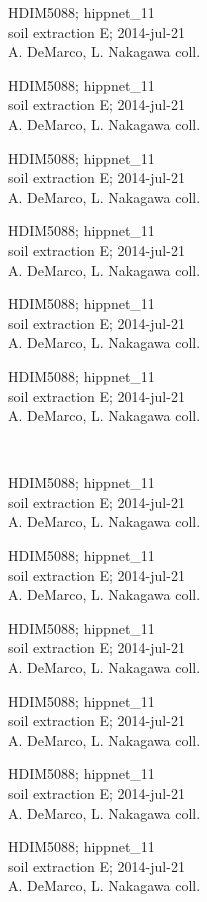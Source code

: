 \documentclass[2pt]{extarticle}
\begin{document}
\noindent
\parbox{0.16\textwidth}{\tiny \raggedright \rule[-0.3\baselineskip]{0pt}{10pt}HDIM5088; hippnet\_11\\ soil extraction E; 2014-jul-21\\ A. DeMarco, L. Nakagawa coll.}
\parbox{0.16\textwidth}{\tiny \raggedright \rule[-0.3\baselineskip]{0pt}{10pt}HDIM5088; hippnet\_11\\ soil extraction E; 2014-jul-21\\ A. DeMarco, L. Nakagawa coll.}
\parbox{0.16\textwidth}{\tiny \raggedright \rule[-0.3\baselineskip]{0pt}{10pt}HDIM5088; hippnet\_11\\ soil extraction E; 2014-jul-21\\ A. DeMarco, L. Nakagawa coll.}
\parbox{0.16\textwidth}{\tiny \raggedright \rule[-0.3\baselineskip]{0pt}{10pt}HDIM5088; hippnet\_11\\ soil extraction E; 2014-jul-21\\ A. DeMarco, L. Nakagawa coll.}
\parbox{0.16\textwidth}{\tiny \raggedright \rule[-0.3\baselineskip]{0pt}{10pt}HDIM5088; hippnet\_11\\ soil extraction E; 2014-jul-21\\ A. DeMarco, L. Nakagawa coll.}
\parbox{0.16\textwidth}{\tiny \raggedright \rule[-0.3\baselineskip]{0pt}{10pt}HDIM5088; hippnet\_11\\ soil extraction E; 2014-jul-21\\ A. DeMarco, L. Nakagawa coll.} \\ 
\vspace{0.001in} 

\noindent
\parbox{0.16\textwidth}{\tiny \raggedright \rule[-0.3\baselineskip]{0pt}{10pt}HDIM5088; hippnet\_11\\ soil extraction E; 2014-jul-21\\ A. DeMarco, L. Nakagawa coll.}
\parbox{0.16\textwidth}{\tiny \raggedright \rule[-0.3\baselineskip]{0pt}{10pt}HDIM5088; hippnet\_11\\ soil extraction E; 2014-jul-21\\ A. DeMarco, L. Nakagawa coll.}
\parbox{0.16\textwidth}{\tiny \raggedright \rule[-0.3\baselineskip]{0pt}{10pt}HDIM5088; hippnet\_11\\ soil extraction E; 2014-jul-21\\ A. DeMarco, L. Nakagawa coll.}
\parbox{0.16\textwidth}{\tiny \raggedright \rule[-0.3\baselineskip]{0pt}{10pt}HDIM5088; hippnet\_11\\ soil extraction E; 2014-jul-21\\ A. DeMarco, L. Nakagawa coll.}
\parbox{0.16\textwidth}{\tiny \raggedright \rule[-0.3\baselineskip]{0pt}{10pt}HDIM5088; hippnet\_11\\ soil extraction E; 2014-jul-21\\ A. DeMarco, L. Nakagawa coll.}
\parbox{0.16\textwidth}{\tiny \raggedright \rule[-0.3\baselineskip]{0pt}{10pt}HDIM5088; hippnet\_11\\ soil extraction E; 2014-jul-21\\ A. DeMarco, L. Nakagawa coll.} \\ 
\vspace{0.001in} 
\end{document}

